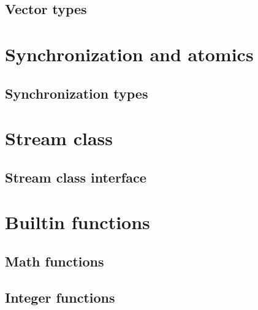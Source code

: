 \documentclass[letterpaper,10pt,english]{sphinxmanual}
\begin{document}
\subsection{Vector types}
\label{\detokenize{programming-interface/types/vector:vector-types}}\label{\detokenize{programming-interface/types/vector::doc}}

\section{Synchronization and atomics}
\label{\detokenize{programming-interface/index:synchronization-and-atomics}}

\subsection{Synchronization types}
\label{\detokenize{programming-interface/synchronization/types:synchronization-types}}\label{\detokenize{programming-interface/synchronization/types::doc}}

\section{Stream class}
\label{\detokenize{programming-interface/index:stream-class}}

\subsection{Stream class interface}
\label{\detokenize{programming-interface/stream/stream:stream-class-interface}}\label{\detokenize{programming-interface/stream/stream::doc}}

\section{Built\sphinxhyphen{}in functions}
\label{\detokenize{programming-interface/index:built-in-functions}}

\subsection{Math functions}
\label{\detokenize{programming-interface/built-in/math:math-functions}}\label{\detokenize{programming-interface/built-in/math::doc}}

\subsection{Integer functions}
\label{\detokenize{programming-interface/built-in/integer:integer-functions}}\label{\detokenize{programming-interface/built-in/integer::doc}}
\end{document}
